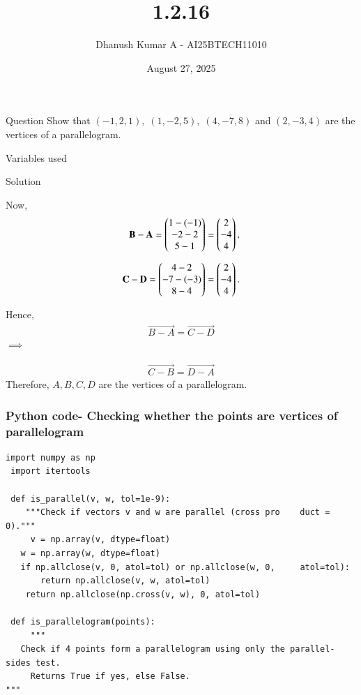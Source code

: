 \documentclass{beamer}
\title 
{1.2.16}
\date{August 27, 2025}
\author 
{Dhanush Kumar A - AI25BTECH11010}
\begin{document}
\frame{\titlepage}
\begin{frame}{Question}
 Show that $(-1,2,1), \; (1,-2,5), \; (4,-7,8)$ and $(2,-3,4)$ are the vertices of a parallelogram.
\end{frame}
\begin{frame}{Variables used}
\begin{table}[H]    
  \centering
  
  \caption{Variables Used}
  \label{tab:1.2.16}
\end{table}
\end{frame}
\begin{frame}{Solution}

	Now,
  \begin{align}
 \mathbf{B - A}= \begin{pmatrix}1 - (-1) \\ -2 - 2 \\ 5 - 1\end{pmatrix} = \begin{pmatrix}2 \\ -4 \\ 4\end{pmatrix}, \\[6pt]
\mathbf{C - D} = \begin{pmatrix}4 - 2 \\ -7 - (-3) \\ 8 - 4\end{pmatrix}= \begin{pmatrix}2 \\ -4 \\ 4\end{pmatrix}.
 \end{align}

 Hence,
 \begin{align}
        \vec{B - A} = \vec{C - D}
 \end{align}
  $\implies$


 \begin{align}
        \vec{C-B} = \vec{D-A}
 \end{align}
	Therefore, $A, B, C, D$ are the vertices of a parallelogram.

\end{frame}

\begin{frame}[fragile]
    \frametitle{Python code- Checking whether the points are vertices of parallelogram}
    \begin{lstlisting}
import numpy as np
 import itertools

 def is_parallel(v, w, tol=1e-9):
    """Check if vectors v and w are parallel (cross pro    duct = 0)."""
     v = np.array(v, dtype=float)
   w = np.array(w, dtype=float)
   if np.allclose(v, 0, atol=tol) or np.allclose(w, 0,     atol=tol):
       return np.allclose(v, w, atol=tol)
    return np.allclose(np.cross(v, w), 0, atol=tol)

 def is_parallelogram(points):
     """
   Check if 4 points form a parallelogram using only the parallel-sides test.
     Returns True if yes, else False.
"""
     \end{lstlisting}
\end{frame}
\end{document}
